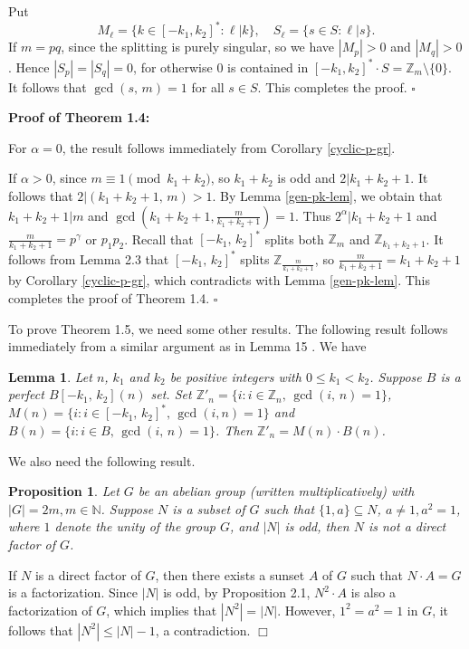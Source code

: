 \documentclass[12pt]{article}
\newtheorem{lem}{Lemma}[section]
\newtheorem{open problem}{Open problem}[section]
\newtheorem{prop}{Proposition}[section]
\newcommand{\qed}{\nopagebreak\hspace*{\fill}$\square$\par\vskip2mm}
\newenvironment{proof}{\trivlist
      \item[\hskip\labelsep
      {\itshape Proof.}]\normalfont}
      {\hspace*{\fill}$\Box$\endtrivlist}
\begin{document}
Put $$M_{\ell}=\{k\in [-k_1,k_2]^*: \ell|k\}, \quad S_{\ell}=\{s\in S: \ell|s\}.$$
If $m=pq$, since the splitting is purely singular,  so we have $|M_p|>0$ and $|M_q|>0$.
Hence $|S_p|=|S_q|=0$,
for otherwise $0$ is contained in $[-k_1,k_2]^*\cdot S=\mathbb{Z}_{m}\setminus \{0\}$. It follows that $\gcd(s, \, m)=1$ for all $s\in S$.
This completes the proof.
\qed

{\bf Proof of Theorem 1.4:}

For $\alpha=0$, the result follows immediately from  Corollary \ref{cyclic-p-gr}.

If $\alpha>0$, since $m\equiv1\pmod{k_1+k_2}$, so $k_1+k_2$ is odd and $2|k_1+k_2+1$.
It follows that $2|(k_1+k_2+1,\,m)>1$.
By Lemma \ref{gen-pk-lem}, we obtain that $k_1 + k_2 + 1|m$ and $\gcd(k_1 + k_2 + 1, \frac{m}{k_1+k_2+1}) = 1$.
Thus  $2^{\alpha}|k_1 + k_2 + 1$ and $\frac{m}{k_1+k_2+1}=p^\gamma$ or $p_1p_2$. Recall that $[-k_1, \,k_2]^\ast$ splits both $\mathbb{Z}_{m}$ and $\mathbb{Z}_{k_1+k_2+1}$. It follows from Lemma 2.3 that $[-k_1, \,k_2]^\ast$ splits $\mathbb{Z}_{\frac{m}{k_1+k_2+1}}$, so $\frac{m}{k_1+k_2+1}=k_1+k_2+1$ by Corollary \ref{cyclic-p-gr}, which contradicts with Lemma \ref{gen-pk-lem}.
This completes the proof of Theorem 1.4.
\qed

To prove Theorem 1.5, we need some other results. The following result follows immediately from a similar argument as in Lemma 15 \cite{[ZG]}.  We have
\begin{lem}\label{BjiaoM}
Let $n$, $k_1$ and $k_2$ be positive integers with $0\leq k_1< k_2$.
Suppose $B$ is a perfect $B[-k_1, \,k_2](n)$ set.
Set $\mathbb{Z}'_n=\{i:i\in \mathbb{Z}_n, \,\gcd(i, \,n)=1\}$,
$M(n)=\{i: i\in [-k_1, \,k_2]^*, \,\gcd(i,n)=1\}$
and $B(n)=\{i: i\in B, \,\gcd(i, \,n)=1\}$.
Then $\mathbb{Z}'_n=M(n)\cdot B(n)$.
\end{lem}

We also need the following result.
\begin{prop}\label{po1}Let $G$ be an abelian group (written multiplicatively)  with $|G|=2m, m\in\mathbb{N}$. Suppose $N$ is a subset of $G$ such that
$\{1, a\}\subseteq N$, $a\ne1, a^2=1$, where $1$ denote the unity of the group $G$,  and $|N|$ is odd, then $N$ is not a direct factor of $G$. \end{prop}
\begin{proof} If $N$ is a direct factor of $G$, then there exists a sunset $A$ of $G$ such that $N\cdot A=G$ is a factorization. Since $|N|$ is odd, by Proposition 2.1, $N^2\cdot A $ is also a factorization of $G$, which implies that $|N^2|=|N|$. However, $1^2=a^2=1$ in $G$, it follows that $|N^2|\le|N|-1$, a contradiction. \end{proof}
\end{document}
